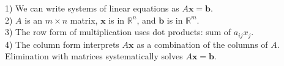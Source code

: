 \documentclass[preview]{standalone}
\begin{document}
\begin{center}
1) We can write systems of linear equations as $A\mathbf{x} = \mathbf{b}$.\\2) $A$ is an $m \times n$ matrix, $\mathbf{x}$ is in $\mathbb{R}^n$, and $\mathbf{b}$ is in $\mathbb{R}^m$.\\3) The row form of multiplication uses dot products: sum of $a_{ij} x_j$.\\4) The column form interprets $A\mathbf{x}$ as a combination of the columns of $A$.\\Elimination with matrices systematically solves $A\mathbf{x} = \mathbf{b}$.
\end{center}
\end{document}
